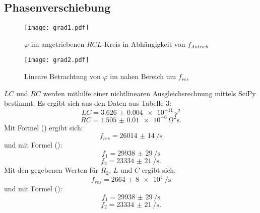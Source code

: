 \subsection{Phasenverschiebung}
\begin{figure}[H]
	\centering
	\caption{$\varphi$ im angetriebenen $RCL$-Kreis in Abhängigkeit von $f_{Antrieb}$ }
	\texttt{[image: grad1.pdf]}
	\label{fig:grad1}
\end{figure}
\begin{figure}[H]
	\centering
	\caption{Lineare Betrachtung von $\varphi$ im nahen Bereich um $f_{res}$}
	\texttt{[image: grad2.pdf]}
	\label{fig:grad2}
\end{figure}

$LC$ und $RC$ werden mithilfe einer nichtlinearen Ausgleichsrechnung mittels SciPy \cite{scipy} bestimmt. Es ergibt sich aus den Daten aus Tabelle 3:
\begin{displaymath}
LC = \SI{3.626(4)e-11}{\second\squared}
\end{displaymath}
\begin{displaymath}
RC = \SI{1.505(10)e-6}{\ohm\squared\second}\text{.}
\end{displaymath}
Mit Formel () ergibt sich:
\begin{displaymath}
f_{res} = \SI{26014(14)}{\per\second}
\end{displaymath}
und mit Formel ():
\begin{displaymath}
f_1 = \SI{29938(29)}{\per\second}
\end{displaymath}
\begin{displaymath}
f_2 = \SI{23334(21)}{\per\second}\text{.}
\end{displaymath}
Mit den gegebenen Werten für $R_2$, $L$ und $C$ ergibt sich:
\begin{displaymath}
f_{res} = \SI{2664(8)e4}{\per\second}
\end{displaymath}
und mit Formel ():
\begin{displaymath}
f_1 = \SI{29938(29)}{\per\second}
\end{displaymath}
\begin{displaymath}
f_2 = \SI{23334(21)}{\per\second}\text{.}
\end{displaymath}


